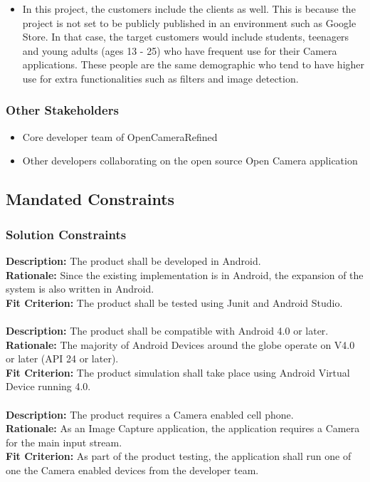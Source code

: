 \documentclass[12pt, titlepage]{article}
\begin{document}
\begin{itemize}
\item In this project, the customers include the clients as well. This is because the project is not set to be publicly published in an environment such as Google Store. In that case, the target customers would include students, teenagers and young adults (ages 13 - 25) who have frequent use for their Camera applications. These people are the same demographic who tend to have higher use for extra functionalities such as filters and image detection. 
\end{itemize}

\subsubsection{Other Stakeholders}

\begin{itemize}
\item Core developer team of OpenCameraRefined
\item Other developers collaborating on the open source Open Camera application
\end{itemize}

\subsection{Mandated Constraints}
\subsubsection{Solution Constraints}
{\color{red}
\textbf{Description:} The product shall be developed in Android. \\
\textbf{Rationale:} Since the existing implementation is in Android, the expansion of the system is also written in Android.\\
\textbf{Fit Criterion:} The product shall be tested using Junit and Android Studio. \\
\\
\textbf{Description:} The product shall be compatible with Android 4.0 or later.\\
\textbf{Rationale:} The majority of Android Devices around the globe operate on V4.0 or later (API 24 or later).\\
\textbf{Fit Criterion:} The product simulation shall take place using Android Virtual Device running 4.0. \\
\\
\textbf{Description:} The product requires a Camera enabled cell phone.\\
\textbf{Rationale:} As an Image Capture application, the application requires a Camera for the main input stream.\\
\textbf{Fit Criterion:} As part of the product testing, the application shall run one of one the Camera enabled devices from the developer team. \\

}
\end{document}
